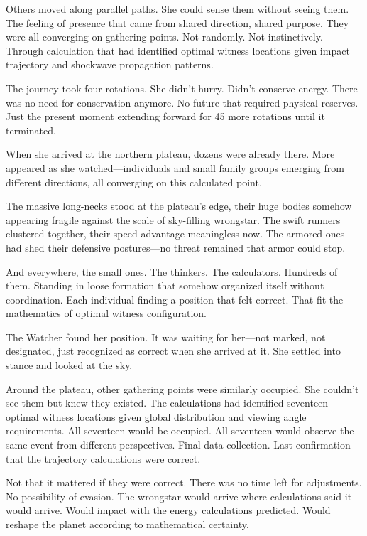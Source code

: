 Others moved along parallel paths. She could sense them without seeing them. The feeling of presence that came from shared direction, shared purpose. They were all converging on gathering points. Not randomly. Not instinctively. Through calculation that had identified optimal witness locations given impact trajectory and shockwave propagation patterns.

The journey took four rotations. She didn't hurry. Didn't conserve energy. There was no need for conservation anymore. No future that required physical reserves. Just the present moment extending forward for 45 more rotations until it terminated.

When she arrived at the northern plateau, dozens were already there. More appeared as she watched—individuals and small family groups emerging from different directions, all converging on this calculated point.

The massive long-necks stood at the plateau's edge, their huge bodies somehow appearing fragile against the scale of sky-filling wrongstar. The swift runners clustered together, their speed advantage meaningless now. The armored ones had shed their defensive postures—no threat remained that armor could stop.

And everywhere, the small ones. The thinkers. The calculators. Hundreds of them. Standing in loose formation that somehow organized itself without coordination. Each individual finding a position that felt correct. That fit the mathematics of optimal witness configuration.

The Watcher found her position. It was waiting for her—not marked, not designated, just recognized as correct when she arrived at it. She settled into stance and looked at the sky.

Around the plateau, other gathering points were similarly occupied. She couldn't see them but knew they existed. The calculations had identified seventeen optimal witness locations given global distribution and viewing angle requirements. All seventeen would be occupied. All seventeen would observe the same event from different perspectives. Final data collection. Last confirmation that the trajectory calculations were correct.

Not that it mattered if they were correct. There was no time left for adjustments. No possibility of evasion. The wrongstar would arrive where calculations said it would arrive. Would impact with the energy calculations predicted. Would reshape the planet according to mathematical certainty.

